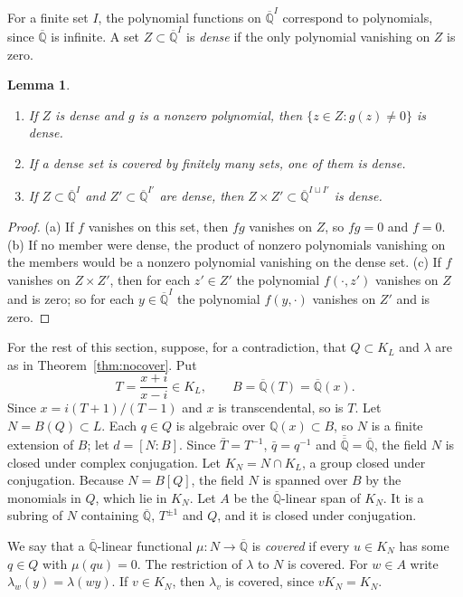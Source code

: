 \documentclass[10pt]{article}
\newtheorem{lem}[thm]{Lemma}
\theoremstyle{remark}
\newcommand{\Q}{\mathbb Q}
\newcommand{\Qbar}{\overline{\mathbb Q}}
\begin{document}
For a finite set $I$, the polynomial functions on $\Qbar^I$ correspond to polynomials, since $\Qbar$ is infinite. A set $Z\subset\Qbar^I$ is \emph{dense} if the only polynomial vanishing on $Z$ is zero.

\begin{lem}\label{lem:zariski}
\begin{enumerate}
\item[(a)] If $Z$ is dense and $g$ is a nonzero polynomial, then $\{z\in Z:g(z)\ne0\}$ is dense.
\item[(b)] If a dense set is covered by finitely many sets, one of them is dense.
\item[(c)] If $Z\subset\Qbar^I$ and $Z'\subset\Qbar^{I'}$ are dense, then $Z\times Z'\subset\Qbar^{I\sqcup I'}$ is dense.
\end{enumerate}
\end{lem}

\begin{proof}
(a) If $f$ vanishes on this set, then $fg$ vanishes on $Z$, so $fg=0$ and $f=0$. (b) If no member were dense, the product of nonzero polynomials vanishing on the members would be a nonzero polynomial vanishing on the dense set. (c) If $f$ vanishes on $Z\times Z'$, then for each $z'\in Z'$ the polynomial $f(\cdot,z')$ vanishes on $Z$ and is zero; so for each $y\in\Qbar^I$ the polynomial $f(y,\cdot)$ vanishes on $Z'$ and is zero.
\end{proof}

For the rest of this section, suppose, for a contradiction, that $Q\subset K_L$ and $\lambda$ are as in Theorem~\ref{thm:nocover}. Put
\[
 T=\frac{x+i}{x-i}\in K_L,\qquad B=\Qbar(T)=\Qbar(x).
\]
Since $x=i(T+1)/(T-1)$ and $x$ is transcendental, so is $T$. Let $N=B(Q)\subset L$. Each $q\in Q$ is algebraic over $\Q(x)\subset B$, so $N$ is a finite extension of $B$; let $d=[N:B]$. Since $\bar T=T^{-1}$, $\bar q=q^{-1}$ and $\overline{\Qbar}=\Qbar$, the field $N$ is closed under complex conjugation. Let $K_N=N\cap K_L$, a group closed under conjugation. Because $N=B[Q]$, the field $N$ is spanned over $B$ by the monomials in $Q$, which lie in $K_N$. Let $A$ be the $\Qbar$-linear span of $K_N$. It is a subring of $N$ containing $\Qbar$, $T^{\pm1}$ and $Q$, and it is closed under conjugation.

We say that a $\Qbar$-linear functional $\mu\colon N\to\Qbar$ is \emph{covered} if every $u\in K_N$ has some $q\in Q$ with $\mu(qu)=0$. The restriction of $\lambda$ to $N$ is covered. For $w\in A$ write $\lambda_w(y)=\lambda(wy)$. If $v\in K_N$, then $\lambda_v$ is covered, since $vK_N=K_N$.
\end{document}
